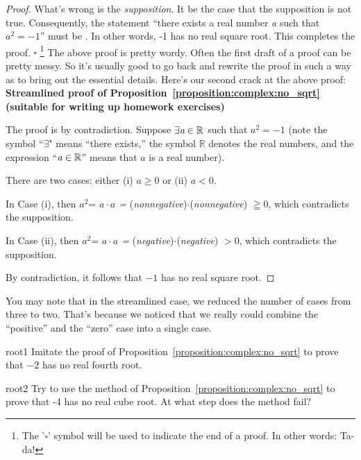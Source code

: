 \begin{proof}
What's wrong is the \emph{supposition}. It  be the case that the supposition is not
true. Consequently, the statement ``there exists a real number
\emph{a} such that $a^{2}=-1$'' must be . In other
words, -1 has no real square root. This completes the proof. $\square$
\footnote{The '$\square$' symbol will be used to indicate the end of a proof. In other words: Ta-da!}
\medskip{}
\newline
The above proof is pretty wordy. Often the first draft of a proof can be pretty messy. So it's usually good to go back and rewrite the proof in such a  way as to bring out the essential details. Here's our second crack at the above proof:
\medskip{}
\newline
\noindent \textbf{Streamlined proof of Proposition~\ref{proposition:complex:no_sqrt} (suitable for writing up homework exercises)}

The proof is by contradiction. Suppose $\exists \emph{a} \in \mathbb{R}$
such that $a^{2}=-1$ (note the symbol ``$\exists$" means ``there exists,'' the symbol $\mathbb{R}$ denotes the real numbers, and the expression ``$\emph{a} \in \mathbb{R}$'' means that $a$ is a real number).

There are two cases: either (i) $a\geq0$ or (ii) $a<0$.

In Case (i), then $a^{2}$= \emph{$a\cdot a$ =} (\emph{nonnegative})$\cdot$(\emph{nonnegative})
$\geqq0$, which contradicts the supposition.

In Case (ii), then $a^{2}$= \emph{$a\cdot a$ =} (\emph{negative})$\cdot$(\emph{negative})
$>0$, which contradicts the supposition.

By contradiction, it follows that $-1$ has no real square root.
\end{proof}
You may note that in the streamlined case, we reduced the number of cases from three to two.  That's because we noticed that we really could combine the ``positive'' and the ``zero'' case into a single case.

\begin{exercise}{root1}
 Imitate the proof of Proposition~\ref{proposition:complex:no_sqrt} to prove that $-2$ has no real fourth root.
\end{exercise}

\begin{exercise}{root2}
Try to use the method of Proposition~\ref{proposition:complex:no_sqrt} to prove that -4 has no real cube root. At what step does the method fail?
\end{exercise}


